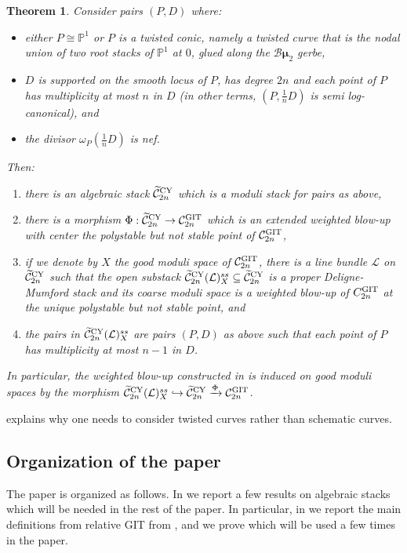 \documentclass{amsart}
\newcommand{\bP}{\mathbb{P}}
\newcommand{\cB}{\mathcal{B}}
\newcommand{\cC}{\mathcal{C}}
\newcommand{\cL}{\mathcal{L}}
\newcommand{\bmu}{\bm{\mu}}
\newcommand{\Ctilde}{\widetilde{\mathcal{C}}}
\newcommand{\git}{{\rm GIT}}
\newcommand{\CY}{{\rm CY}}
\newtheorem{Teo}[theorem]{Theorem}
\theoremstyle{definition}
\theoremstyle{definition}
\begin{document}
{\begin{Teo}\label{thm_intro_hassett}
Consider pairs $(P,D)$ where:
        \begin{itemize}
            \item either $P\cong \bP^1$ or $P$ is a twisted conic, namely a twisted curve that is the nodal union of two root stacks of $\bP^1$ at $0$, glued along the $\cB\bmu_2$ gerbe, 
            \item $D$ is supported on the smooth locus of $P$, has degree $2n$ and each point of $P$ has multiplicity at most $n$ in $D$ (in other terms, $(P,\frac{1}{n}D)$ is semi log-canonical), and
            \item the divisor $\omega_P(\frac{1}{n}D)$ is nef.
        \end{itemize}
        Then:
        \begin{enumerate}
            \item there is an algebraic stack $\Ctilde^{\CY}_{2n}$ which is a moduli stack for pairs as above,
            \item there is a morphism $\Phi:\Ctilde^{\CY}_{2n}\to \cC^{\git}_{2n}$ which is an extended weighted blow-up with center the polystable but not stable point of $\cC^{\git}_{2n}$,
            \item if we denote by $X$ the good moduli space of $\cC^{\git}_{2n}$, there is a line bundle $\cL$ on $\Ctilde^{\CY}_{2n}$ such that the open substack $\Ctilde^{\CY}_{2n}(\cL)^{ss}_X\subseteq\widetilde{\cC}^\CY_{2n}$ is a proper Deligne-Mumford stack and its coarse moduli space is a weighted blow-up of $C_{2n}^{\git}$ at the unique polystable but not stable point, and
            \item the pairs in $\Ctilde^{\CY}_{2n}(\cL)^{ss}_{X}$ are pairs $(P,D)$ as above such that each point of $P$ has multiplicity at most $n-1$ in $D$. 
        \end{enumerate}
        In particular, the weighted blow-up constructed in \cite{moduli_pointed_curves_via_git} is induced on good moduli spaces by the morphism $\Ctilde_{2n}^{\CY}(\cL)^{ss}_{X}\hookrightarrow\Ctilde_{2n}^{\CY}\xrightarrow{\Phi}\cC^{\git}_{2n}$.
        \end{Teo}
         explains why one needs to consider twisted curves rather than schematic curves.


 \subsection{Organization of the paper} The paper is organized as follows. In  we report a few results on algebraic stacks which will be needed in the rest of the paper. In particular, in  we report the main definitions from relative GIT from \cite{Alp}, and we prove  which will be used a few times in the paper. 
 
}
\end{document}
